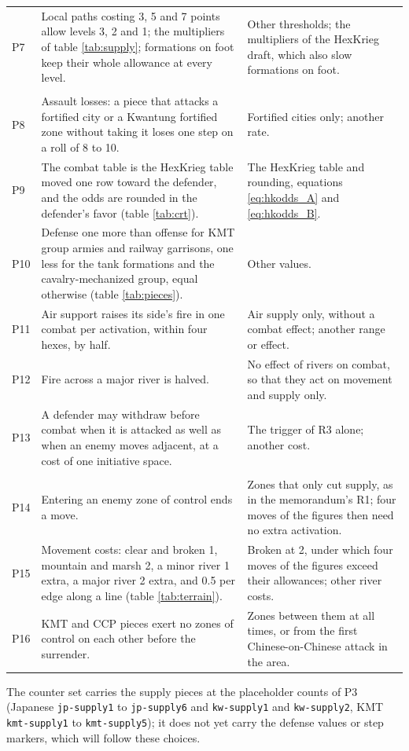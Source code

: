 \documentclass[11pt]{article}
\begin{document}
{\begin{longtable}{@{}>{\raggedright\arraybackslash}p{}>{\raggedright\arraybackslash}p{}>{\raggedright\arraybackslash}p{}@{}}
P7 & Local paths costing 3, 5 and 7 points allow levels 3, 2 and 1; the multipliers of table \ref{tab:supply}; formations on foot keep their whole allowance at every level. & Other thresholds; the multipliers of the HexKrieg draft, which also slow formations on foot. \\
\multicolumn{3}{@{}l}{\textbf{Combat} (section \ref{sub:combat})} \\
P8 & Assault losses: a piece that attacks a fortified city or a Kwantung fortified zone without taking it loses one step on a roll of 8 to 10. & Fortified cities only; another rate. \\
P9 & The combat table is the HexKrieg table moved one row toward the defender, and the odds are rounded in the defender's favor (table \ref{tab:crt}). & The HexKrieg table and rounding, equations \eqref{eq:hkodds_A} and \eqref{eq:hkodds_B}. \\
P10 & Defense one more than offense for KMT group armies and railway garrisons, one less for the tank formations and the cavalry-mechanized group, equal otherwise (table \ref{tab:pieces}). & Other values. \\
P11 & Air support raises its side's fire in one combat per activation, within four hexes, by half. & Air supply only, without a combat effect; another range or effect. \\
P12 & Fire across a major river is halved. & No effect of rivers on combat, so that they act on movement and supply only. \\
P13 & A defender may withdraw before combat when it is attacked as well as when an enemy moves adjacent, at a cost of one initiative space. & The trigger of R3 alone; another cost. \\
\multicolumn{3}{@{}l}{\textbf{Movement} (sections \ref{sub:terrain} and \ref{sub:move})} \\
P14 & Entering an enemy zone of control ends a move. & Zones that only cut supply, as in the memorandum's R1; four moves of the figures then need no extra activation. \\
P15 & Movement costs: clear and broken 1, mountain and marsh 2, a minor river 1 extra, a major river 2 extra, and 0.5 per edge along a line (table \ref{tab:terrain}). & Broken at 2, under which four moves of the figures exceed their allowances; other river costs. \\
P16 & KMT and CCP pieces exert no zones of control on each other before the surrender. & Zones between them at all times, or from the first Chinese-on-Chinese attack in the area. \\
\end{longtable}
}
The counter set carries the supply pieces at the placeholder counts of P3 (Japanese \texttt{jp-supply1} to \texttt{jp-supply6} and \texttt{kw-supply1} and \texttt{kw-supply2}, KMT \texttt{kmt-supply1} to \texttt{kmt-supply5}); it does not yet carry the defense values or step markers, which will follow these choices.
\clearpage
\end{document}

